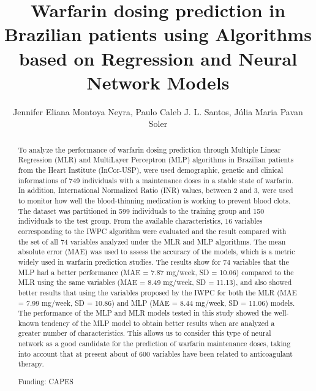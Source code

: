 \documentclass[twoside]{article}
\title{\vspace{-15mm}\fontsize{24pt}{10pt}\selectfont\textbf{ Warfarin dosing prediction in Brazilian patients using Algorithms based on Regression and Neural Network Models }} %
\author{ Jennifer Eliana Montoya Neyra, Paulo Caleb J. L. Santos, J\'ulia Maria Pavan Soler }
\affil{ Laboratory of Genetics and Molecular Cardiology,  Faculdade de Medicina FMUSP,  Heart Institute (InCor),  University of S\~ao Paulo. }
\date{}
\begin{document}
  
  
  \maketitle %
  
  
  \thispagestyle{fancy} %
  
  
  \begin{abstract}
  To analyze the performance of warfarin dosing prediction through Multiple Linear Regression (MLR) and MultiLayer Perceptron (MLP) algorithms in Brazilian patients from the Heart Institute (InCor-USP),  were used demographic,  genetic and clinical informations of 749 individuals with a maintenance doses in a stable state of warfarin. In addition,  International Normalized Ratio (INR) values,  between 2 and 3,  were used to monitor how well the blood-thinning medication is working to prevent blood clots. The dataset was partitioned in 599 individuals to the training group and 150 individuals to the test group. From the available characteristics,  16 variables corresponding to the IWPC algorithm were evaluated and the result compared with the set of all 74 variables analyzed under the MLR and MLP algorithms. The mean absolute error (MAE) was used to assess the accuracy of the models,  which is a metric widely used in warfarin prediction studies. 
The results show for 74 variables that the MLP had a better performance (MAE = 7.87 mg/week,  SD = 10.06) compared to the MLR using the same variables (MAE = 8.49 mg/week,  SD = 11.13),  and also showed better results that using the variables proposed by the IWPC for both the MLR (MAE = 7.99 mg/week,  SD = 10.86) and MLP (MAE = 8.44 mg/week,  SD = 11.06) models. The performance of the MLP and MLR models tested in this study showed the well-known tendency of the MLP model to obtain better results when are analyzed a greater number of characteristics. This allows us to consider this type of neural network as a good candidate for the prediction of warfarin maintenance doses,  taking into account that at present about of 600 variables have been related to anticoagulant therapy.
  
  Funding: CAPES \\ 
  \end{abstract}
  
\end{document}
